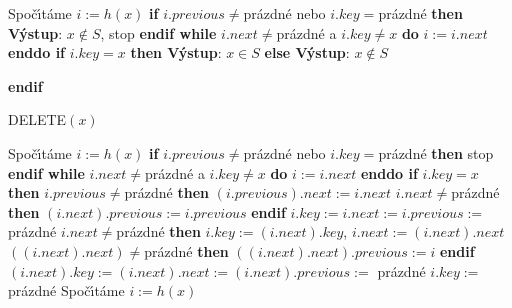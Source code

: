 \documentclass[a4paper,12pt]{article}
\begin{document}
\newline 
Spo\v c\'\i t\'ame $i:=h(x)$\newline 
{\bf if} $i.previous\ne$pr\'azdn\'e nebo $i.key=$pr\'azdn\'e {\bf then V\'ystup}: $
x\notin S$, stop {\bf endif \newline 
while} $i.next\ne$pr\'azdn\'e a $i.key\ne x$ {\bf do} $i:=i.next$ {\bf enddo\newline 
if} $i.key=x$ {\bf then V\'ystup}: $x\in S$ {\bf else V\'ystup}: $
x\notin S$ {\bf endif\medskip

\flushpar DELETE$(x)$}\newline 
Spo\v c\'\i t\'ame $i:=h(x)$\newline 
{\bf if} $i.previous\ne$pr\'azdn\'e nebo $i.key=$pr\'azdn\'e {\bf then} stop {\bf endif\newline 
while} $i.next\ne$pr\'azdn\'e a $i.key\ne x$ {\bf do} $i:=i.next$ {\bf enddo \newline 
if} $i.key=x$ {\bf then}\newline  
\phantom{---}{\bf if} $i.previous\ne$pr\'azdn\'e {\bf then}\newline 
\phantom{------}$(i.previous).next:=i.next$\newline 
\phantom{------}{\bf if} $i.next\ne$pr\'azdn\'e {\bf then} $(i.n
ext).previous:=i.previous$ {\bf endif}\newline 
\phantom{------}$i.key:=i.next:=i.previous:=$ pr\'azdn\'e \newline 
\phantom{---}{\bf else}\newline 
\phantom{------}{\bf if} $i.next\ne$pr\'azdn\'e {\bf then}\newline 
\phantom{---------}$i.key:=(i.next).key$, $i.next:=(i.next).next$\newline 
\phantom{---------}{\bf if} $((i.next).next)\ne$pr\'azdn\'e {\bf then} $
((i.next).next).previous:=i$ {\bf endif}\newline 
\phantom{---------}$(i.next).key:=(i.next).next:=(i.next).previous:=$ pr\'azdn\'e \newline 
\phantom{------}{\bf else}\newline 
\phantom{---------}$i.key:=$ pr\'azdn\'e \newline 
\phantom{------}{\bf endif}\newline 
\phantom{---}{\bf endif\newline 
endif
\bigskip

\flushpar INSERT$(x)$}\newline 
Spo\v c\'\i t\'ame $i:=h(x)$\newline
\end{document}
